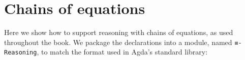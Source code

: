 \hypertarget{chains-of-equations}{%
\section{Chains of equations}\label{chains-of-equations}}

Here we show how to support reasoning with chains of equations, as used
throughout the book. We package the declarations into a module, named
\texttt{≡-Reasoning}, to match the format used in Agda's standard
library:

\begin{fence}
\begin{code}%
\>[0]\AgdaSpace{}%
\AgdaSpace{}%
\AgdaSymbol{\{}\AgdaSpace{}%
\AgdaSymbol{:}\AgdaSpace{}%
\AgdaSymbol{\}}\AgdaSpace{}%
\<%
\\
%
\\[\AgdaEmptyExtraSkip]%
\>[0][@{}l@{\AgdaIndent{0}}]%
\>[2]%
\>[9]\AgdaSpace{}%
\<%
\\
%
\>[2]\AgdaSpace{}%
\AgdaSpace{}%
\AgdaSpace{}%
\<%
\\
%
\>[2]%
\>[9]\AgdaSpace{}%
\<%
\\
%
\\[\AgdaEmptyExtraSkip]%
%
\>[2]\AgdaSpace{}%
\AgdaSymbol{:}\AgdaSpace{}%
\AgdaSpace{}%
\AgdaSymbol{\{}\AgdaSpace{}%
\AgdaSpace{}%
\AgdaSymbol{:}\AgdaSpace{}%
\AgdaSymbol{\}}\<%
\\
\>[2][@{}l@{\AgdaIndent{0}}]%
\>[4]%
\>[194I]\AgdaSpace{}%
\AgdaSpace{}%
\<%
\\
\>[.][@{}l@{}]\<[194I]%
\>[6]\AgdaComment{-----}\<%
\\
%
\>[4]\AgdaSpace{}%
\AgdaSpace{}%
\AgdaSpace{}%
\<%
\\
%
\>[2]\AgdaSpace{}%
%
\>[13]\AgdaSymbol{=}%
\>[16]\<%
\\

\end{code}
\end{fence}
